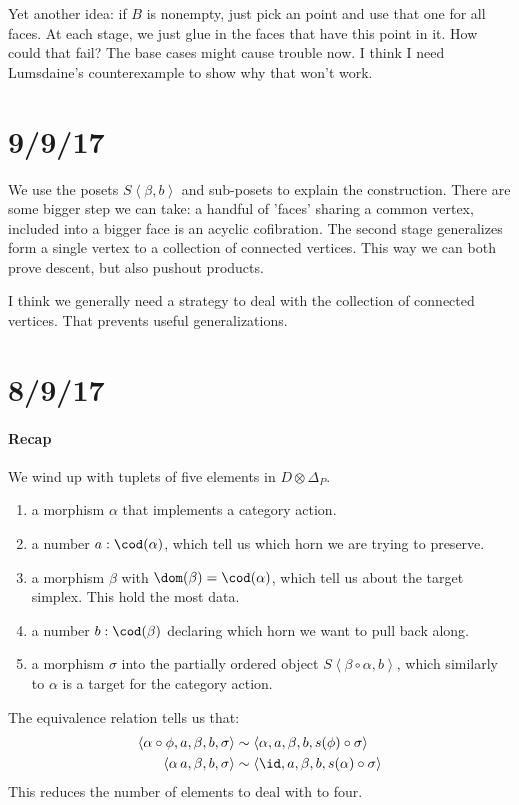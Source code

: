\documentclass{tac}
\newcommand\of{:}
\newcommand\simplex\Delta
\newcommand\tuplet[1]{\left\langle #1 \right\rangle}
\begin{document}
Yet another idea: if $B$ is nonempty, just pick an point and use that one for all faces. At each stage, we just glue in the faces that have this point in it. How could that fail? The base cases might cause trouble now. I think I need Lumsdaine's counterexample to show why that won't work.

\section{9/9/17}
We use the posets $S\tuplet{\beta,b}$ and sub-posets to explain the construction. There are some bigger step we can take: a handful of 'faces' sharing a common vertex, included into a bigger face is an acyclic cofibration. The second stage generalizes form a single vertex to a collection of connected vertices. This way we can both prove descent, but also pushout products.

I think we generally need a strategy to deal with the collection of connected vertices. That prevents useful generalizations.

\section{8/9/17}

\paragraph{Recap}
We wind up with tuplets of five elements in $D\otimes \simplex_P$.
\begin{enumerate}
\item a morphism $\alpha$ that implements a category action.
\item a number $a\of\cod(\alpha)$, which tell us which horn we are trying to preserve.
\item a morphism $\beta$ with $\dom(\beta) = \cod(\alpha)$, which tell us about the target simplex. This hold the most data.
\item a number $b\of \cod(\beta)$ declaring which horn we want to pull back along.
\item a morphism $\sigma$ into the partially ordered object $S\tuplet{\beta\circ \alpha,b}$, which similarly to $\alpha$ is a target for the category action.
\end{enumerate}
The equivalence relation tells us that:
\begin{align*}
\tuplet{\alpha\circ\phi,a,\beta,b,\sigma}&\sim
\tuplet{\alpha,a,\beta,b,s(\phi)\circ\sigma}\\
\tuplet{\alpha\,a,\beta,b,\sigma}&\sim
\tuplet{\id,a,\beta,b,s(\alpha)\circ\sigma}\\
\end{align*}
This reduces the number of elements to deal with to four.
\end{document}
